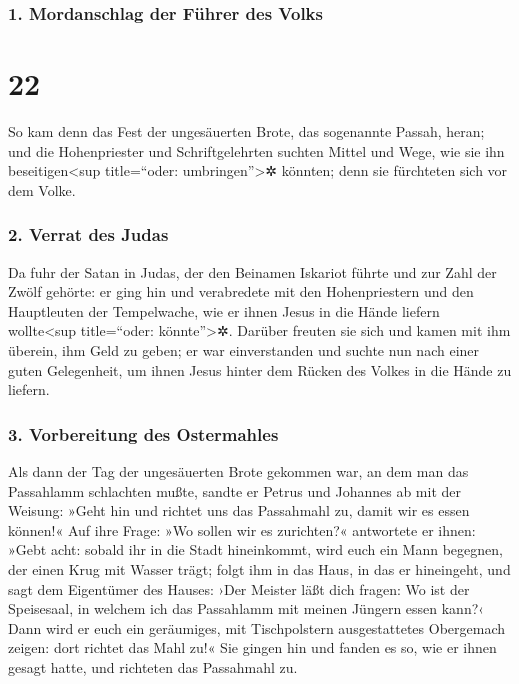 \hypertarget{mordanschlag-der-fuxfchrer-des-volks}{%
\subsubsection{1. Mordanschlag der Führer des
Volks}\label{mordanschlag-der-fuxfchrer-des-volks}}

\hypertarget{section-21}{%
\section{22}\label{section-21}}

 So kam denn das Fest der ungesäuerten Brote, das
sogenannte Passah, heran;  und die Hohenpriester und
Schriftgelehrten suchten Mittel und Wege, wie sie ihn
beseitigen\textless sup title=``oder: umbringen''\textgreater✲ könnten;
denn sie fürchteten sich vor dem Volke.

\hypertarget{verrat-des-judas}{%
\subsubsection{2. Verrat des Judas}\label{verrat-des-judas}}

 Da fuhr der Satan in Judas, der den Beinamen Iskariot
führte und zur Zahl der Zwölf gehörte:  er ging hin und
verabredete mit den Hohenpriestern und den Hauptleuten der Tempelwache,
wie er ihnen Jesus in die Hände liefern wollte\textless sup
title=``oder: könnte''\textgreater✲.  Darüber freuten sie
sich und kamen mit ihm überein, ihm Geld zu geben;  er war
einverstanden und suchte nun nach einer guten Gelegenheit, um ihnen
Jesus hinter dem Rücken des Volkes in die Hände zu liefern.

\hypertarget{vorbereitung-des-ostermahles}{%
\subsubsection{3. Vorbereitung des
Ostermahles}\label{vorbereitung-des-ostermahles}}

 Als dann der Tag der ungesäuerten Brote gekommen war, an
dem man das Passahlamm schlachten mußte,  sandte er Petrus
und Johannes ab mit der Weisung: »Geht hin und richtet uns das
Passahmahl zu, damit wir es essen können!«  Auf ihre
Frage: »Wo sollen wir es zurichten?«  antwortete er
ihnen: »Gebt acht: sobald ihr in die Stadt hineinkommt, wird euch ein
Mann begegnen, der einen Krug mit Wasser trägt; folgt ihm in das Haus,
in das er hineingeht,  und sagt dem Eigentümer des
Hauses: ›Der Meister läßt dich fragen: Wo ist der Speisesaal, in welchem
ich das Passahlamm mit meinen Jüngern essen kann?‹  Dann
wird er euch ein geräumiges, mit Tischpolstern ausgestattetes Obergemach
zeigen: dort richtet das Mahl zu!«  Sie gingen hin und
fanden es so, wie er ihnen gesagt hatte, und richteten das Passahmahl
zu.

